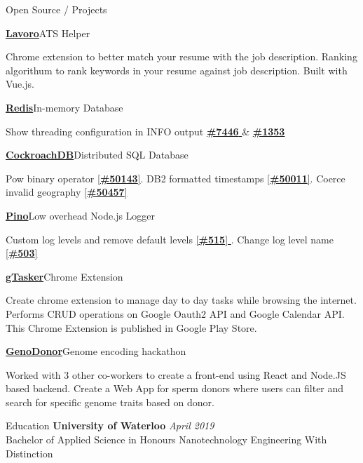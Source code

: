 \documentclass{resume}
\begin{document}
  \begin{rSection}{Open Source / Projects}
    \begin{rProjectSection}{\href{https://chrome.google.com/webstore/detail/lavoro/apkdfigakniknjehnfaoopfhihahhnpp?hl=en&authuser=0}{\textbf{Lavoro}}}{ATS Helper}
      \item Chrome extension to better match your resume with the job description. Ranking algorithum to rank keywords in your resume against job description. Built with Vue.js.
    \end{rProjectSection}
    \begin{rProjectSection}{\href{https://github.com/redis/redis}{\textbf{Redis}}}{In-memory Database}
      \item Show threading configuration in INFO output \href{https://github.com/redis/redis/pull/7446}{ \textbf{\#7446} } \& \href{https://github.com/redis/redis-doc/pull/1353}{\textbf{\#1353}}
    \end{rProjectSection}
    \begin{rProjectSection}{\href{https://github.com/cockroachdb/cockroach}{\textbf {CockroachDB}}}{Distributed SQL Database}
      \item Pow binary operator \href{https://github.com/cockroachdb/cockroach/pull/50143}{[\textbf{\#50143}]}. DB2 formatted timestamps \href{https://github.com/cockroachdb/cockroach/pull/50011}{[\textbf{\#50011}]}. Coerce invalid geography \href{https://github.com/cockroachdb/cockroach/pull/50457}{[\textbf{\#50457}]}
    \end{rProjectSection}
    \begin{rProjectSection}{\href{https://github.com/pinojs/pino}{\textbf{Pino}}}{Low overhead Node.js Logger}
      \item Custom log levels and remove default levels \href{https://github.com/pinojs/pino/pull/515}{ [\textbf{\#515}] }. Change log level name \href{https://github.com/pinojs/pino/pull/503}{ [\textbf{\#503}] }
    \end{rProjectSection}
    \begin{rProjectSection}{\href{https://chrome.google.com/webstore/detail/gtasker-extension/lljekoepijafpdebkahcjdhbjaappami?hl=en-GB}{\textbf{gTasker}}}{Chrome Extension}
      \item Create chrome extension to manage day to day tasks while browsing the internet. Performs CRUD operations on Google Oauth2 API and Google Calendar API. This Chrome Extension is published in Google Play Store.
    \end{rProjectSection}
    \begin{rProjectSection}{\href{https://github.com/Arun4rangan/GenoDonor}{\textbf{GenoDonor}}}{Genome encoding hackathon}
      \item Worked with 3 other co-workers to create a front-end using React and Node.JS based backend. Create a Web App for sperm donors where users can filter and search for specific genome traits based on donor.
    \end{rProjectSection}
  \end{rSection}
  

  \begin{rSection}{Education}
    {\bf University of Waterloo} \hfill {\em April 2019} \\ 
    { Bachelor of Applied Science in Honours Nanotechnology Engineering With Distinction }
  \end{rSection}
\end{document}
